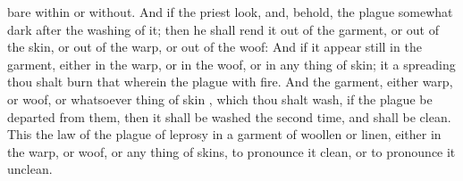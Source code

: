 {{} bare
within or
without.
And if the
priest
look, and, behold, the
plague
{} somewhat
dark
after the
washing of it; then he shall
rend it out of the
garment, or out of the
skin, or out of the
warp, or out of the
woof:
And if it
appear
still in the
garment, either in the
warp, or in the
woof, or in any
thing of
skin; it
{} a
spreading
{} thou shalt
burn that wherein the
plague
{} with
fire.
And the
garment, either
warp, or
woof, or whatsoever
thing of
skin
{}, which thou shalt
wash, if the
plague be
departed from them, then it shall be
washed the
second time, and shall be
clean.
This
{} the
law of the
plague of
leprosy in a
garment of
woollen or
linen, either in the
warp, or
woof, or any
thing of
skins, to pronounce it
clean, or to pronounce it
unclean.

}
